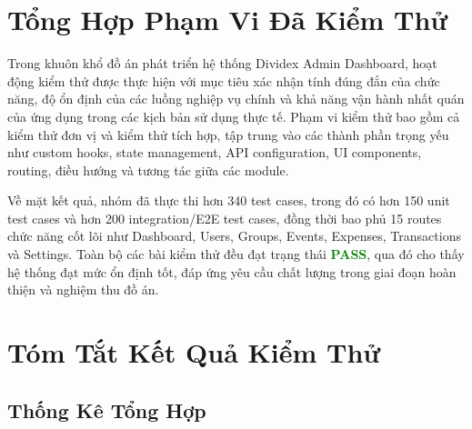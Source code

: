 \documentclass[12pt,a4paper,vietnamese]{article}
\begin{document}

\section{Tổng Hợp Phạm Vi Đã Kiểm Thử}

Trong khuôn khổ đồ án phát triển hệ thống Dividex Admin Dashboard, hoạt động kiểm thử được thực hiện với mục tiêu xác nhận tính đúng đắn của chức năng, độ ổn định của các luồng nghiệp vụ chính và khả năng vận hành nhất quán của ứng dụng trong các kịch bản sử dụng thực tế. Phạm vi kiểm thử bao gồm cả kiểm thử đơn vị và kiểm thử tích hợp, tập trung vào các thành phần trọng yếu như custom hooks, state management, API configuration, UI components, routing, điều hướng và tương tác giữa các module.

Về mặt kết quả, nhóm đã thực thi hơn 340 test cases, trong đó có hơn 150 unit test cases và hơn 200 integration/E2E test cases, đồng thời bao phủ 15 routes chức năng cốt lõi như Dashboard, Users, Groups, Events, Expenses, Transactions và Settings. Toàn bộ các bài kiểm thử đều đạt trạng thái \textcolor{green}{\textbf{PASS}}, qua đó cho thấy hệ thống đạt mức ổn định tốt, đáp ứng yêu cầu chất lượng trong giai đoạn hoàn thiện và nghiệm thu đồ án.


\section{Tóm Tắt Kết Quả Kiểm Thử}

\subsection{Thống Kê Tổng Hợp}
\end{document}

